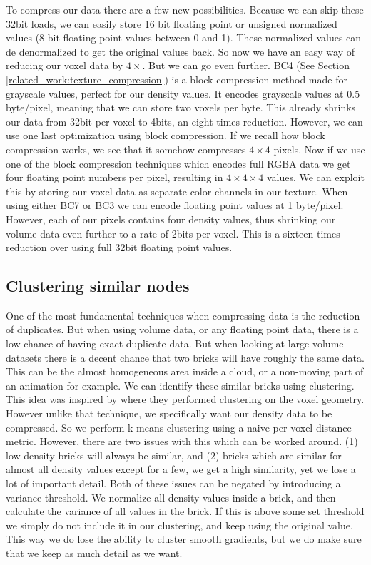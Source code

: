 To compress our data there are a few new possibilities. Because we can skip these 32bit loads, we can easily store 16 bit floating point or unsigned normalized values (8 bit floating point values between 0 and 1). These normalized values can de denormalized to get the original values back. So now we have an easy way of reducing our voxel data by $4\times$. But we can go even further. BC4 (See Section \ref{related_work:texture_compression}) is a block compression method made for grayscale values, perfect for our density values. It encodes grayscale values at $0.5$ byte/pixel, meaning that we can store two voxels per byte. This already shrinks our data from 32bit per voxel to 4bits, an eight times reduction. However, we can use one last optimization using block compression. If we recall how block compression works, we see that it somehow compresses $4\times 4$ pixels. Now if we use one of the block compression techniques which encodes full RGBA data we get four floating point numbers per pixel, resulting in $4 \times 4 \times 4$ values. We can exploit this by storing our voxel data as separate color channels in our texture. When using either BC7 or BC3 we can encode floating point values at 1 byte/pixel. However, each of our pixels contains four density values, thus shrinking our volume data even further to a rate of 2bits per voxel. This is a sixteen times reduction over using full 32bit floating point values.

\subsection{Clustering similar nodes} \label{approach:clustering_similar_nodes}
One of the most fundamental techniques when compressing data is the reduction of duplicates. But when using volume data, or any floating point data, there is a low chance of having exact duplicate data. But when looking at large volume datasets there is a decent chance that two bricks will have roughly the same data. This can be the almost homogeneous area inside a cloud, or a non-moving part of an animation for example. We can identify these similar bricks using clustering. This idea was inspired by \cite{van2020lossy} where they performed clustering on the voxel geometry. However unlike that technique, we specifically want our density data to be compressed. So we perform k-means clustering using a naive per voxel distance metric. However, there are two issues with this which can be worked around. (1) low density bricks will always be similar, and (2) bricks which are similar for almost all density values except for a few, we get a high similarity, yet we lose a lot of important detail. Both of these issues can be negated by introducing a variance threshold. We normalize all density values inside a brick, and then calculate the variance of all values in the brick. If this is above some set threshold we simply do not include it in our clustering, and keep using the original value. This way we do lose the ability to cluster smooth gradients, but we do make sure that we keep as much detail as we want.